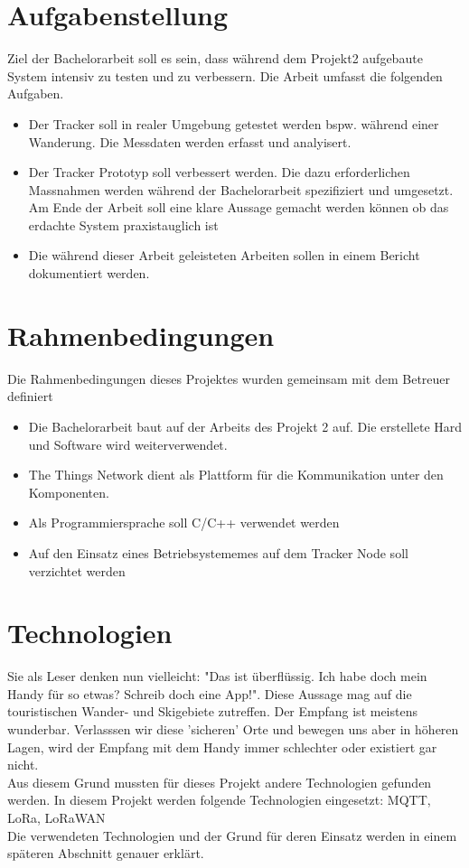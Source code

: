 \documentclass[11pt,english,german]{report}
\theoremstyle{definition}
\begin{document}
\section{Aufgabenstellung}
Ziel der Bachelorarbeit soll es sein, dass während dem Projekt2 aufgebaute System intensiv zu testen und zu verbessern. Die Arbeit umfasst die folgenden Aufgaben.
\begin{itemize}
\item
Der Tracker soll in realer Umgebung getestet werden bspw. während einer Wanderung. Die Messdaten werden erfasst und analyisert.
\item Der Tracker Prototyp soll verbessert werden. Die dazu erforderlichen Massnahmen werden während der Bachelorarbeit spezifiziert und umgesetzt. Am Ende der Arbeit soll eine klare Aussage gemacht werden können ob das erdachte System praxistauglich ist
\item
Die während dieser Arbeit geleisteten Arbeiten sollen in einem Bericht dokumentiert werden.
\end{itemize}

\section{Rahmenbedingungen}
Die Rahmenbedingungen dieses Projektes wurden gemeinsam mit dem Betreuer definiert
\begin{itemize}
\item Die Bachelorarbeit baut auf der Arbeits des Projekt 2 auf. Die erstellete Hard und Software wird weiterverwendet.
\item The Things Network dient als Plattform für die Kommunikation unter den Komponenten.
\item Als Programmiersprache soll C/C++ verwendet werden
\item Auf den Einsatz eines Betriebsystememes auf dem Tracker Node soll verzichtet werden
\end{itemize}

\section{Technologien}
Sie als Leser denken nun vielleicht: "Das ist überflüssig. Ich habe doch mein Handy für so etwas? Schreib doch eine App!". Diese Aussage mag auf die touristischen Wander- und Skigebiete zutreffen. Der Empfang ist meistens wunderbar. Verlasssen wir diese 'sicheren' Orte und bewegen uns aber in höheren Lagen, wird der Empfang mit dem Handy immer schlechter oder existiert gar nicht. \bigskip \\
Aus diesem Grund mussten für dieses Projekt andere Technologien gefunden werden. In diesem Projekt werden folgende Technologien eingesetzt:
MQTT, LoRa, LoRaWAN\bigskip \\
Die verwendeten Technologien und der Grund für deren Einsatz werden in einem späteren Abschnitt genauer erklärt.
\end{document}
